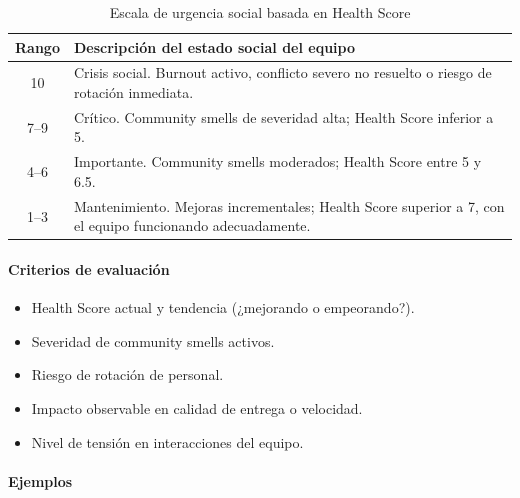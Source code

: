 \begin{table}[h]
    \centering
    \small
    \begin{tabularx}{\textwidth}{|c|X|}
        \hline
        \textbf{Rango} & \textbf{Descripción del estado social del equipo}                                                         \\
        \hline
        10             & Crisis social. Burnout activo, conflicto severo no resuelto o riesgo de rotación inmediata.               \\
        \hline
        7--9           & Crítico. Community smells de severidad alta; Health Score inferior a 5.                                   \\
        \hline
        4--6           & Importante. Community smells moderados; Health Score entre 5 y 6.5.                                       \\
        \hline
        1--3           & Mantenimiento. Mejoras incrementales; Health Score superior a 7, con el equipo funcionando adecuadamente. \\
        \hline
    \end{tabularx}
    \caption{Escala de urgencia social basada en Health Score}
    \label{tab:escala-urgencia-social}
\end{table}
\FloatBarrier

\paragraph{Criterios de evaluación}

\begin{itemize}
    \item Health Score actual y tendencia (¿mejorando o empeorando?).
    \item Severidad de community smells activos.
    \item Riesgo de rotación de personal.
    \item Impacto observable en calidad de entrega o velocidad.
    \item Nivel de tensión en interacciones del equipo.
\end{itemize}

\paragraph{Ejemplos}

